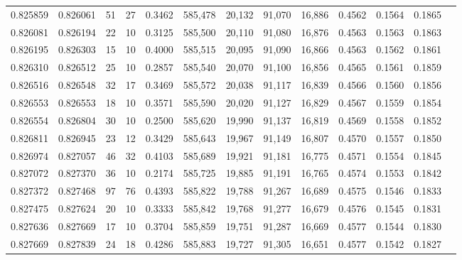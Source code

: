 \begin{tabular}{rrrrrrrrrrrrr}
0.825859 & 0.826061 &    51 &  27 &                                     0.3462 & 585,478 &  20,132 &  91,070 &  16,886 & 0.4562 & 0.1564 & 0.1865 \\
0.826081 & 0.826194 &    22 &  10 &                                     0.3125 & 585,500 &  20,110 &  91,080 &  16,876 & 0.4563 & 0.1563 & 0.1863 \\
0.826195 & 0.826303 &    15 &  10 &                                     0.4000 & 585,515 &  20,095 &  91,090 &  16,866 & 0.4563 & 0.1562 & 0.1861 \\
0.826310 & 0.826512 &    25 &  10 &                                     0.2857 & 585,540 &  20,070 &  91,100 &  16,856 & 0.4565 & 0.1561 & 0.1859 \\
0.826516 & 0.826548 &    32 &  17 &                                     0.3469 & 585,572 &  20,038 &  91,117 &  16,839 & 0.4566 & 0.1560 & 0.1856 \\
0.826553 & 0.826553 &    18 &  10 &                                     0.3571 & 585,590 &  20,020 &  91,127 &  16,829 & 0.4567 & 0.1559 & 0.1854 \\
0.826554 & 0.826804 &    30 &  10 &                                     0.2500 & 585,620 &  19,990 &  91,137 &  16,819 & 0.4569 & 0.1558 & 0.1852 \\
0.826811 & 0.826945 &    23 &  12 &                                     0.3429 & 585,643 &  19,967 &  91,149 &  16,807 & 0.4570 & 0.1557 & 0.1850 \\
0.826974 & 0.827057 &    46 &  32 &                                     0.4103 & 585,689 &  19,921 &  91,181 &  16,775 & 0.4571 & 0.1554 & 0.1845 \\
0.827072 & 0.827370 &    36 &  10 &                                     0.2174 & 585,725 &  19,885 &  91,191 &  16,765 & 0.4574 & 0.1553 & 0.1842 \\
0.827372 & 0.827468 &    97 &  76 &                                     0.4393 & 585,822 &  19,788 &  91,267 &  16,689 & 0.4575 & 0.1546 & 0.1833 \\
0.827475 & 0.827624 &    20 &  10 &                                     0.3333 & 585,842 &  19,768 &  91,277 &  16,679 & 0.4576 & 0.1545 & 0.1831 \\
0.827636 & 0.827669 &    17 &  10 &                                     0.3704 & 585,859 &  19,751 &  91,287 &  16,669 & 0.4577 & 0.1544 & 0.1830 \\
0.827669 & 0.827839 &    24 &  18 &                                     0.4286 & 585,883 &  19,727 &  91,305 &  16,651 & 0.4577 & 0.1542 & 0.1827 \\

\end{tabular}
